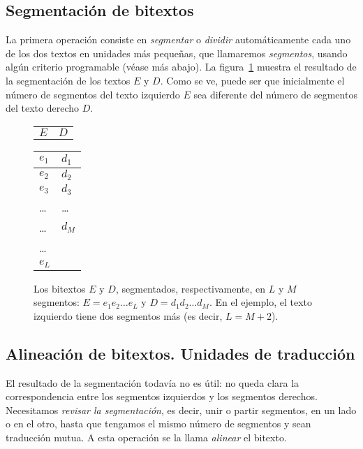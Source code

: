 \subsection{Segmentación de bitextos} La primera operación consiste en \emph{segmentar} o \emph{dividir} automáticamente cada uno de los dos textos en unidades más pequeñas, que llamaremos \emph{segmentos}, usando algún criterio programable (véase más abajo). La figura~\ref{fg:segmentat} muestra el resultado de la segmentación de los textos $E$ y $D$. Como se ve, puede ser que inicialmente el número de segmentos del texto izquierdo $E$ sea diferente del número de segmentos del texto derecho $D$. \begin{figure} \begin{center} \begin{tabular}{p{3cm}p{3cm}} $E$ &$D$ \end{tabular} \begin{tabular}{|p{3cm}|p{3cm}|} \hline

$e_1$ &$d_1$ \\\hline $e_2$ &$d_2$ \\\hline $e_3$ &$d_3$ \\\hline \ldots &\ldots \\\hline \ldots &$d_M$ \\\hline \ldots \\\cline{1-1} $e_L$ \\\cline{1-1} \end{tabular} \end{center} \caption{Los bitextos $E$ y $D$, segmentados, respectivamente, en $L$ y $M$ segmentos: $E=e_1e_2\ldots e_L$ y $D=d_1d_2\ldots d_M$. En el ejemplo, el texto izquierdo tiene dos segmentos más (es decir, $L=M+2$).} \label{fg:segmentat} \end{figure} 

\subsection{Alineación de bitextos. Unidades de traducción} 

El resultado de la segmentación todavía no es útil: no queda clara la correspondencia entre los segmentos izquierdos y los segmentos derechos. Necesitamos \emph{revisar la segmentación}, es decir, unir o partir segmentos, en un lado o en el otro, hasta que tengamos el mismo número de segmentos y sean traducción mutua. A esta operación se la llama \emph{alinear} el bitexto. 

